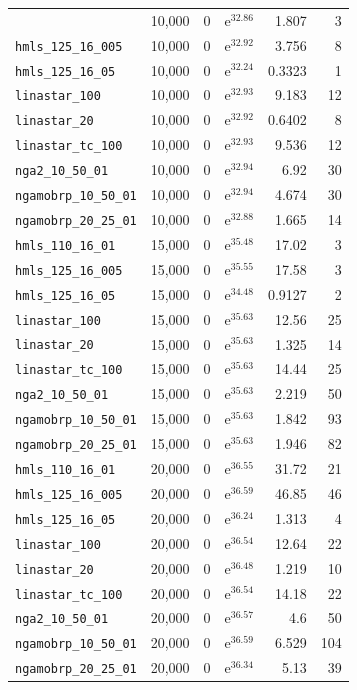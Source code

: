 \begin{longtable}{|l|r|r|r|r|r|}
{    \texttt{hmls\_110\_16\_01} & 10,000 & 0 & $\mathrm{e}^{32.86}$ & 1.807 & 3 \\
    \texttt{hmls\_125\_16\_005} & 10,000 & 0 & $\mathrm{e}^{32.92}$ & 3.756 & 8 \\
    \texttt{hmls\_125\_16\_05} & 10,000 & 0 & $\mathrm{e}^{32.24}$ & 0.3323 & 1 \\
    \texttt{linastar\_100} & 10,000 & 0 & $\mathrm{e}^{32.93}$ & 9.183 & 12 \\
    \texttt{linastar\_20} & 10,000 & 0 & $\mathrm{e}^{32.92}$ & 0.6402 & 8 \\
    \texttt{linastar\_tc\_100} & 10,000 & 0 & $\mathrm{e}^{32.93}$ & 9.536 & 12 \\
    \texttt{nga2\_10\_50\_01} & 10,000 & 0 & $\mathrm{e}^{32.94}$ & 6.92 & 30 \\
    \texttt{ngamobrp\_10\_50\_01} & 10,000 & 0 & $\mathrm{e}^{32.94}$ & 4.674 & 30 \\
    \texttt{ngamobrp\_20\_25\_01} & 10,000 & 0 & $\mathrm{e}^{32.88}$ & 1.665 & 14 \\
    \texttt{hmls\_110\_16\_01} & 15,000 & 0 & $\mathrm{e}^{35.48}$ & 17.02 & 3 \\
    \texttt{hmls\_125\_16\_005} & 15,000 & 0 & $\mathrm{e}^{35.55}$ & 17.58 & 3 \\
    \texttt{hmls\_125\_16\_05} & 15,000 & 0 & $\mathrm{e}^{34.48}$ & 0.9127 & 2 \\
    \texttt{linastar\_100} & 15,000 & 0 & $\mathrm{e}^{35.63}$ & 12.56 & 25 \\
    \texttt{linastar\_20} & 15,000 & 0 & $\mathrm{e}^{35.63}$ & 1.325 & 14 \\
    \texttt{linastar\_tc\_100} & 15,000 & 0 & $\mathrm{e}^{35.63}$ & 14.44 & 25 \\
    \texttt{nga2\_10\_50\_01} & 15,000 & 0 & $\mathrm{e}^{35.63}$ & 2.219 & 50 \\
    \texttt{ngamobrp\_10\_50\_01} & 15,000 & 0 & $\mathrm{e}^{35.63}$ & 1.842 & 93 \\
    \texttt{ngamobrp\_20\_25\_01} & 15,000 & 0 & $\mathrm{e}^{35.63}$ & 1.946 & 82 \\
    \texttt{hmls\_110\_16\_01} & 20,000 & 0 & $\mathrm{e}^{36.55}$ & 31.72 & 21 \\
    \texttt{hmls\_125\_16\_005} & 20,000 & 0 & $\mathrm{e}^{36.59}$ & 46.85 & 46 \\
    \texttt{hmls\_125\_16\_05} & 20,000 & 0 & $\mathrm{e}^{36.24}$ & 1.313 & 4 \\
    \texttt{linastar\_100} & 20,000 & 0 & $\mathrm{e}^{36.54}$ & 12.64 & 22 \\
    \texttt{linastar\_20} & 20,000 & 0 & $\mathrm{e}^{36.48}$ & 1.219 & 10 \\
    \texttt{linastar\_tc\_100} & 20,000 & 0 & $\mathrm{e}^{36.54}$ & 14.18 & 22 \\
    \texttt{nga2\_10\_50\_01} & 20,000 & 0 & $\mathrm{e}^{36.57}$ & 4.6 & 50 \\
    \texttt{ngamobrp\_10\_50\_01} & 20,000 & 0 & $\mathrm{e}^{36.59}$ & 6.529 & 104 \\
    \texttt{ngamobrp\_20\_25\_01} & 20,000 & 0 & $\mathrm{e}^{36.34}$ & 5.13 & 39 \\
\end{longtable}
